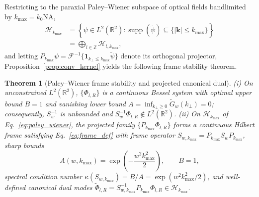 \documentclass[aps,pra,reprint,amsmath,amssymb,floatfix,longbibliography]{revtex4-2}
\providecommand{\abs}[1]{\lvert#1\rvert}
\newtheorem{theorem}{Theorem}
\begin{document}
Restricting to the paraxial Paley--Wiener subspace of optical fields bandlimited by $k_{\max} = k_0 \mathrm{NA}$,
\begin{align}
\mathcal{H}_{k_{\max}} &= \left\{\psi \in L^2(\mathbb{R}^2) : \operatorname{supp}(\widetilde{\psi}) \subseteq \{\abs{\mathbf{k}} \le k_{\max}\}\right\} \nonumber \\
&= \bigoplus_{l\in\mathbb{Z}} \mathcal{H}_{l,k_{\max}},
\label{eq:paley_wiener}
\end{align}
and letting $P_{k_{\max}}\psi = \mathcal{F}^{-1}\{\mathbf{1}_{k_\perp \le k_{\max}}\widetilde{\psi}\}$ denote its orthogonal projector, Proposition~\ref{prop:conv_kernel} yields the following frame stability theorem.

\begin{theorem}[Paley--Wiener frame stability and projected canonical dual]
\label{thm:pw_bounds}
(i) On unconstrained $L^2(\mathbb{R}^2)$, $\{\Phi_{l,R}\}$ is a continuous Bessel system with optimal upper bound $B=1$ and vanishing lower bound $A = \inf_{k_\perp \ge 0} \widetilde{G}_w(k_\perp) = 0$; consequently, $S_w^{-1}$ is unbounded and $S_w^{-1}\Phi_{l,R} \notin L^2(\mathbb{R}^2)$. (ii) On $\mathcal{H}_{k_{\max}}$ of Eq.~\eqref{eq:paley_wiener}, the projected family $\{P_{k_{\max}}\Phi_{l,R}\}$ forms a continuous Hilbert frame satisfying Eq.~\eqref{eq:frame_def} with frame operator $S_{w,k_{\max}} = P_{k_{\max}} S_w P_{k_{\max}}$, sharp bounds
\begin{equation}
A(w, k_{\max}) = \exp\!\left(-\frac{w^2 k_{\max}^2}{2}\right), \qquad B = 1,
\label{eq:optimal_bounds}
\end{equation}
spectral condition number $\kappa(S_{w,k_{\max}}) = B/A = \exp(w^2 k_{\max}^2/2)$, and well-defined canonical dual modes $\widetilde{\Phi}_{l,R} = S_{w,k_{\max}}^{-1} P_{k_{\max}}\Phi_{l,R} \in \mathcal{H}_{k_{\max}}$.
\end{theorem}
\end{document}
